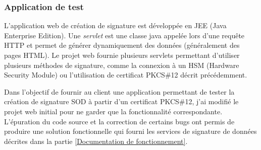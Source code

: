 
\subsubsection{Application de test}

L'application web de création de signature est développée en JEE (Java Enterprise Edition).
Une \textit{servlet} est une classe java appelée lors d'une requête HTTP et permet de générer dynamiquement des données (généralement des pages HTML).
Le projet web fournie plusieurs servlets permettant d'utiliser plusieurs méthodes de signature, comme la connexion à un HSM (Hardware Security Module) ou l'utilisation de certificat PKCS\#12 décrit précédemment.

Dans l'objectif de fournir au client une application permettant de tester la création de signature SOD à partir d'un certificat PKCS\#12, j'ai modifié le projet web initial pour ne garder que la fonctionnalité correspondante.
L'épuration du code source et la correction de certains bugs ont permis de produire une solution fonctionnelle qui fourni les services de signature de données décrites dans la partie \ref{Documentation de fonctionnement}.